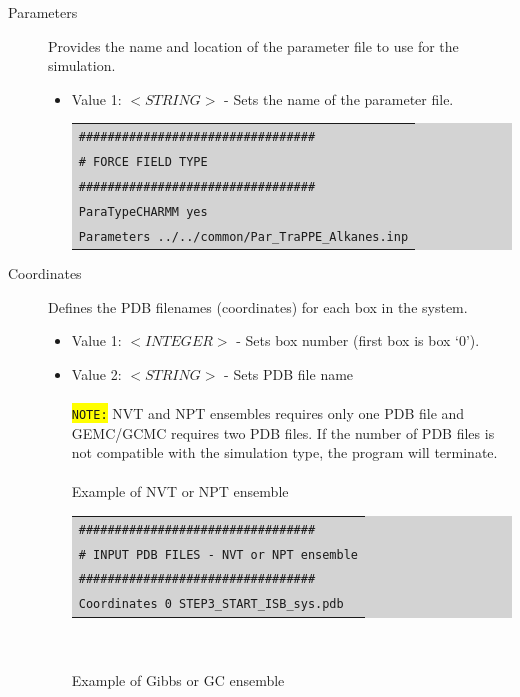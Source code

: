 \begin{description}
\item [Parameters] Provides the name and location of the parameter file to use for the simulation.
	\begin{itemize}	
	\item Value 1: $<STRING>$ - Sets the name of the parameter file.\\
	\colorbox{lightgray}{
	\begin{tabular}{l}
	\texttt{\#\#\#\#\#\#\#\#\#\#\#\#\#\#\#\#\#\#\#\#\#\#\#\#\#\#\#\#\#\#\#\#\#}\\
	\texttt{\# FORCE FIELD TYPE}\\
	\texttt{\#\#\#\#\#\#\#\#\#\#\#\#\#\#\#\#\#\#\#\#\#\#\#\#\#\#\#\#\#\#\#\#\#}\\
	\texttt{ParaTypeCHARMM yes}\\
	\texttt{Parameters ../../common/Par\_TraPPE\_Alkanes.inp}\\
	\end{tabular}}
	\end{itemize}
\item [Coordinates] Defines the PDB filenames (coordinates) for each box in the system.
	\begin{itemize}	
	\item Value 1: $<INTEGER>$ - Sets box number (first box is box `0').\\
	\item Value 2: $<STRING>$ - Sets PDB file name\\\\
	\colorbox{yellow}{\texttt{NOTE:}} NVT and NPT ensembles requires only one PDB file and GEMC/GCMC requires two PDB files. If the number of PDB files is not compatible with the simulation type, the program will terminate. \\\\
	Example of NVT or NPT ensemble\\
	\colorbox{lightgray}{
	\begin{tabular}{l}
	\texttt{\#\#\#\#\#\#\#\#\#\#\#\#\#\#\#\#\#\#\#\#\#\#\#\#\#\#\#\#\#\#\#\#\#}\\
	\texttt{\# INPUT PDB FILES - NVT or NPT ensemble}\\
	\texttt{\#\#\#\#\#\#\#\#\#\#\#\#\#\#\#\#\#\#\#\#\#\#\#\#\#\#\#\#\#\#\#\#\#}\\
	\texttt{Coordinates 0 STEP3\_START\_ISB\_sys.pdb}\\
	\end{tabular}}\\\\
	Example of Gibbs or GC ensemble\\

\end{itemize}
\end{description}
